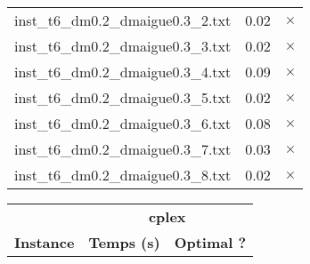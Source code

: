 \documentclass{article}
\begin{document}
\begin{center}
\begin{tabular}{lrr}
inst\_t6\_dm0.2\_dmaigue0.3\_2.txt & 0.02 & 
$\times$
\\
inst\_t6\_dm0.2\_dmaigue0.3\_3.txt & 0.02 & 
$\times$
\\
inst\_t6\_dm0.2\_dmaigue0.3\_4.txt & 0.09 & 
$\times$
\\
inst\_t6\_dm0.2\_dmaigue0.3\_5.txt & 0.02 & 
$\times$
\\
inst\_t6\_dm0.2\_dmaigue0.3\_6.txt & 0.08 & 
$\times$
\\
inst\_t6\_dm0.2\_dmaigue0.3\_7.txt & 0.03 & 
$\times$
\\
inst\_t6\_dm0.2\_dmaigue0.3\_8.txt & 0.02 & 
$\times$
\\
\hline\end{tabular}
\end{center}

\newpage
\begin{center}
\renewcommand{\arraystretch}{1.4} 
 \begin{tabular}{lrr}
	\hline
 & \multicolumn{2}{c}{\textbf{cplex}}\\
\textbf{Instance}  & \textbf{Temps (s)} & \textbf{Optimal ?} \\\hline


\end{tabular}
\end{center}
\end{document}
